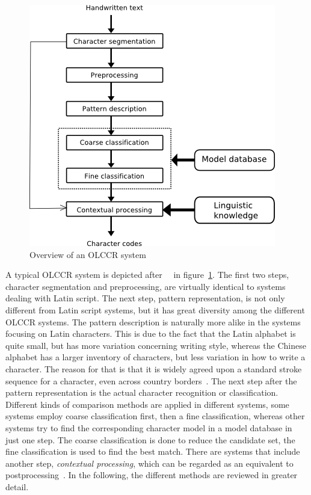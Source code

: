 \begin{figure}[htbp]
  \begin{center}
\includegraphics[scale=0.5]{images/olccrSystemOverview.png}
\caption{Overview of an OLCCR system}
\label{fig:olccrsystemoverview}
  \end{center}
\end{figure}

A typical OLCCR system is depicted 
after~~\citeyear{LiuJaegerNakagawa2004} in 
figure~\ref{fig:olccrsystemoverview}.
The first two steps, character segmentation and preprocessing, are virtually
identical to systems dealing with Latin script. The next step, pattern 
representation, is not only different from Latin script systems, but it has
great diversity among the different OLCCR systems.
The pattern description is naturally more alike in the systems focusing on 
Latin characters. This is due to the fact that the Latin alphabet is quite 
small, but has more variation concerning writing style, whereas the Chinese 
alphabet has a larger inventory of characters, but less variation in how to 
write a character. The reason for that is that it is widely agreed upon a 
standard stroke sequence for a character, even across country 
borders~.
The next step after the pattern representation is the actual character 
recognition or classification. Different kinds of comparison methods are
applied in different systems, some systems employ coarse classification 
first, then a fine classification, whereas other systems try to find the 
corresponding character model in a model database in just one step.
The coarse classification is done to reduce the candidate set, the fine 
classification is used to find the best match. There are systems that 
include another step, \emph{contextual processing}, which can be regarded 
as an equivalent to postprocessing~.
In the following, the different methods are reviewed in greater detail.

